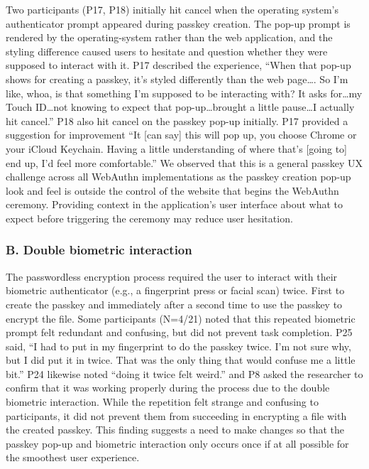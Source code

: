 Two participants (P17, P18) initially hit cancel when the operating system's authenticator prompt appeared during passkey creation. The pop-up prompt is rendered by the operating-system rather than the web application, and the styling difference caused users to hesitate and question whether they were supposed to interact with it. P17 described the experience, ``When that pop-up shows for creating a passkey, it's styled differently than the web page\ldots. So I'm like, whoa, is that something I'm supposed to be interacting with? It asks for\ldots my Touch ID\ldots not knowing to expect that pop-up\ldots brought a little pause\ldots I actually hit cancel.'' P18 also hit cancel on the passkey pop-up initially. P17 provided a suggestion for improvement ``It [can say] this will pop up, you choose Chrome or your iCloud Keychain. Having a little understanding of where that's [going to] end up, I'd feel more comfortable.'' We observed that this is a general passkey UX challenge across all WebAuthn implementations as the passkey creation pop-up look and feel is outside the control of the website that begins the WebAuthn ceremony. Providing context in the application's user interface about what to expect before triggering the ceremony may reduce user hesitation.

\subsubsection*{B. Double biometric interaction}

The passwordless encryption process required the user to interact with their biometric authenticator (e.g., a fingerprint press or facial scan) twice. First to create the passkey and immediately after a second time to use the passkey to encrypt the file. Some participants (N=4/21) noted that this repeated biometric prompt felt redundant and confusing, but did not prevent task completion. P25 said, ``I had to put in my fingerprint to do the passkey twice. I'm not sure why, but I did put it in twice. That was the only thing that would confuse me a little bit.'' P24 likewise noted ``doing it twice felt weird.'' and P8 asked the researcher to confirm that it was working properly during the process due to the double biometric interaction. While the repetition felt strange and confusing to participants, it did not prevent them from succeeding in encrypting a file with the created passkey. This finding suggests a need to make changes so that the passkey pop-up and biometric interaction only occurs once if at all possible for the smoothest user experience.

